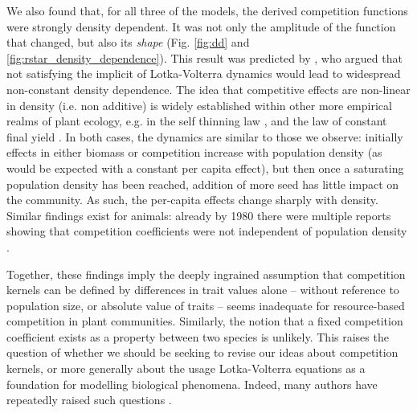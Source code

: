 \documentclass[a4paper,11pt]{article}
\begin{document}
We also found that, for all three of the models, the derived
competition functions were strongly density dependent. It was not only
the amplitude of the function that changed, but also its \emph{shape}
(Fig. \ref{fig:dd} and \ref{fig:rstar_density_dependence}).
%
This result was predicted by \citet{Abrams-1980}, who argued that not
satisfying the implicit of Lotka-Volterra dynamics would lead to
widespread non-constant density dependence. The idea that competitive
effects are non-linear in density (i.e. non additive) is widely
established within other more empirical realms of plant ecology, e.g.
in the self thinning law \citep{Westoby-1984}, and the law of constant
final yield \citep{Weiner-2010}.
In both cases, the dynamics are similar to those we observe: initially
effects in either biomass or competition increase with population
density (as would be expected with a constant per capita effect), but
then once a saturating population density has been reached, addition
of more seed has little impact on the community. As such, the
per-capita effects change sharply with density. Similar findings exist
for animals: already by 1980 there were multiple reports showing that
competition coefficients were not independent of population density
\citep{Abrams-1980}.

Together, these findings imply the deeply ingrained assumption that
competition kernels can be defined by differences in trait values
alone -- without reference to population size, or absolute value of
traits -- seems inadequate for resource-based competition in plant
communities.
%
Similarly, the notion that a fixed competition coefficient exists as a
property between two species is unlikely. This raises the question of
whether we should be seeking to revise our ideas about competition
kernels, or more generally about the usage Lotka-Volterra equations as
a foundation for modelling biological phenomena.  Indeed, many authors
have repeatedly raised such questions \citep[e.g.][]{Andrewartha-1953,
  Neill-1974, Abrams-1975, Wangersky-1978,Abrams-1980, Tilman-1987,
  Abrams-2008}.
\end{document}
